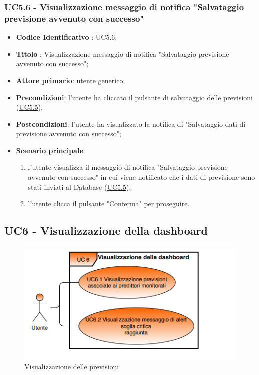 	\label{par:UC5.6}
	\subsubsection{UC5.6 - Visualizzazione messaggio di notifica "Salvataggio previsione avvenuto con successo"}	\begin{itemize}
			\item\textbf{Codice Identificativo} : UC5.6;
			\item\textbf{Titolo} : Visualizzazione messaggio di notifica "Salvataggio previsione avvenuto con successo";
			\item\textbf{Attore primario}: utente generico;
			\item\textbf{Precondizioni}: l'utente ha cliccato il pulsante di salvataggio delle previsioni (\hyperref[par:UC5.5]{UC5.5});
			\item\textbf{Postcondizioni}: l'utente ha visualizzato la notifica di "Salvataggio dati di previsione avvenuto con successo";
			\item\textbf{Scenario principale}:
				\begin{enumerate}
					\item l'utente visualizza il messaggio di notifica "Salvataggio previsione avvenuto con successo" in cui viene notificato che i dati di previsione sono stati inviati al Database (\hyperref[par:UC5.5]{UC5.5});
					\item l'utente clicca il pulsante "Conferma" per proseguire.		
				\end{enumerate}		
		\end{itemize}



	\label{par:UC6}
	\subsection{UC6 - Visualizzazione della dashboard}

	\begin{figure}[H]
		\centering
		\includegraphics[scale=0.80]{../Analisi_dei_requisiti/img/Diagrammi_UML/UC6_Visualizzazione_della_dashboard.png}
		\caption{Visualizzazione delle previsioni}
	\end{figure}

